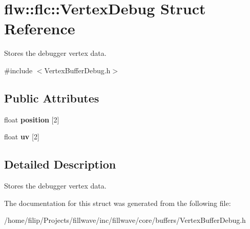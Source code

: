 \hypertarget{structflw_1_1flc_1_1VertexDebug}{}\section{flw\+:\+:flc\+:\+:Vertex\+Debug Struct Reference}
\label{structflw_1_1flc_1_1VertexDebug}


Stores the debugger vertex data.  




{\ttfamily \#include $<$Vertex\+Buffer\+Debug.\+h$>$}

\subsection*{Public Attributes}
\begin{DoxyCompactItemize}
\item 
float {\bfseries position} \mbox{[}2\mbox{]}\hypertarget{structflw_1_1flc_1_1VertexDebug_a7a5c6d20040bba39797557c8f4dd9ec9}{}\label{structflw_1_1flc_1_1VertexDebug_a7a5c6d20040bba39797557c8f4dd9ec9}

\item 
float {\bfseries uv} \mbox{[}2\mbox{]}\hypertarget{structflw_1_1flc_1_1VertexDebug_a878178542fbb4713cb0c1495ca5fd27b}{}\label{structflw_1_1flc_1_1VertexDebug_a878178542fbb4713cb0c1495ca5fd27b}

\end{DoxyCompactItemize}


\subsection{Detailed Description}
Stores the debugger vertex data. 

The documentation for this struct was generated from the following file\+:\begin{DoxyCompactItemize}
\item 
/home/filip/\+Projects/fillwave/inc/fillwave/core/buffers/Vertex\+Buffer\+Debug.\+h\end{DoxyCompactItemize}
